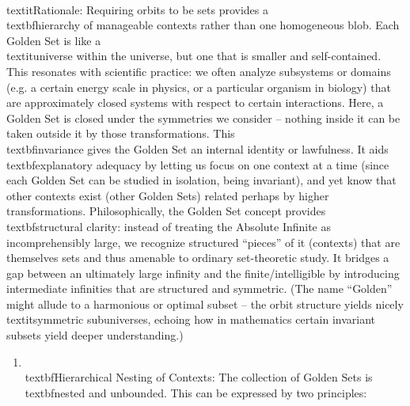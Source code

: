 \documentclass[11pt]{article}
\begin{document}
    \\textit{Rationale:} Requiring orbits to be sets provides a \\textbf{hierarchy of manageable contexts} rather than one homogeneous blob. Each Golden Set is like a \\textit{universe within the universe}, but one that is smaller and self-contained. This resonates with scientific practice: we often analyze subsystems or domains (e.g. a certain energy scale in physics, or a particular organism in biology) that are approximately closed systems with respect to certain interactions. Here, a Golden Set is closed under the symmetries we consider – nothing inside it can be taken outside it by those transformations. This \\textbf{invariance} gives the Golden Set an internal identity or lawfulness. It aids \\textbf{explanatory adequacy} by letting us focus on one context at a time (since each Golden Set can be studied in isolation, being invariant), and yet know that other contexts exist (other Golden Sets) related perhaps by higher transformations. Philosophically, the Golden Set concept provides \\textbf{structural clarity}: instead of treating the Absolute Infinite as incomprehensibly large, we recognize structured “pieces” of it (contexts) that are themselves sets and thus amenable to ordinary set-theoretic study. It bridges a gap between an ultimately large infinity and the finite/intelligible by introducing intermediate infinities that are structured and symmetric. (The name “Golden” might allude to a harmonious or optimal subset – the orbit structure yields nicely \\textit{symmetric} subuniverses, echoing how in mathematics certain invariant subsets yield deeper understanding.)

\begin{enumerate}
  \item \\textbf{Hierarchical Nesting of Contexts:} The collection of Golden Sets is \\textbf{nested and unbounded}. This can be expressed by two principles:
\end{enumerate}
\end{document}
